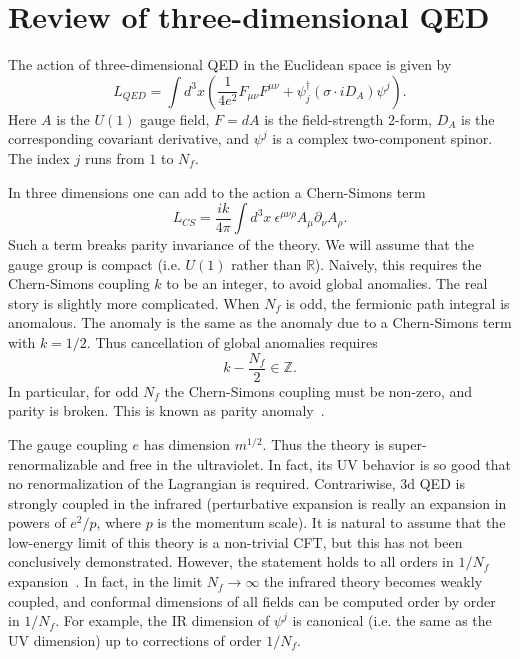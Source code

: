 \documentclass[a4paper,12pt, amsfonts, amssymb]{article}
\newcommand{\RR}{{\mathbb R}}
\newcommand{\ZZ}{{\mathbb Z}}
\newcommand{\ra}{\rightarrow}
\newcommand{\eps}{\epsilon}
\begin{document}
\section{Review of three-dimensional QED}

The action of three-dimensional QED in the Euclidean space is given by
$$
L_{QED}=\int d^3 x \left(\frac{1}{4e^2} F_{\mu\nu} F^{\mu\nu} +
\psi^\dagger_j \left(\sigma \cdot iD_A\right) \psi^j\right).
$$
Here $A$ is the $U(1)$ gauge field, $F=dA$ is the field-strength 2-form,
$D_A$ is the corresponding covariant derivative,
and $\psi^j$ is a complex two-component spinor. The index $j$ runs from 
$1$ to $N_f$. 

In three dimensions one can add to the action a Chern-Simons term
$$
L_{CS}=\frac{ik}{4\pi} \int d^3 x\ \eps^{\mu\nu\rho} A_\mu 
\partial_\nu A_\rho.
$$
Such a term breaks parity invariance of the theory.
We will assume that the gauge group is compact (i.e.
$U(1)$ rather than $\RR$). Naively, this requires the Chern-Simons
coupling $k$ to be an integer, to avoid global anomalies. The real
story is slightly more complicated. When $N_f$ is odd, the fermionic path
integral is anomalous. The anomaly is the same as the anomaly due
to a Chern-Simons term with $k=1/2$. Thus cancellation of global
anomalies requires
$$
k-\frac{N_f}{2}\in \ZZ.
$$
In particular, for odd $N_f$ the Chern-Simons coupling must be non-zero,
and parity is broken. This is known as parity anomaly~\cite{Redlich}.

The gauge coupling $e$ has dimension $m^{1/2}$. Thus the theory is
super-renormalizable and free in the ultraviolet. In fact, its UV
behavior is so good that no renormalization of the Lagrangian is required.
Contrariwise, 3d QED is strongly coupled in the infrared (perturbative
expansion is really an expansion in powers of $e^2/p$, where $p$ is
the momentum scale).
It is natural to assume that the
low-energy limit of this theory is a non-trivial CFT, but this has not
been conclusively demonstrated. However, the statement holds
to all orders in $1/N_f$ expansion~\cite{AP,JT,Templeton,AH}. 
In fact, in the limit 
$N_f\ra\infty$ the infrared theory becomes weakly coupled, and
conformal dimensions of all fields can be computed order by order 
in $1/N_f$. For example, the IR dimension of $\psi^j$ is 
canonical (i.e. the same as the UV dimension) up to corrections of 
order $1/N_f$. 
\end{document}
